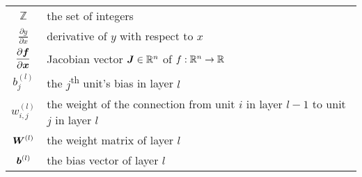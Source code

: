 \documentclass[../main.tex]{subfiles}
\begin{document}
\begin{tabular}{cl}
    $\displaystyle \mathbb{Z}$ & the set of integers\\
    $\displaystyle \frac{\partial y}{\partial x}$ & derivative of $y$ with respect to $x$\\
    $\displaystyle \frac{\partial {\bm{f}}}{\partial {\bm{x}}}$ & Jacobian vector ${\bm{J}}\in \mathbb{R}^n$ of $f:\mathbb{R}^n\to\mathbb{R}$\\
    $\displaystyle b_j^{(l)}$ & the $j$\textsuperscript{th} unit's bias in layer $l$\\
    $\displaystyle w_{i,j}^{(l)}$ & the weight of the connection from unit $i$ in layer $l-1$ to unit $j$ in layer $l$\\
    $\displaystyle {\bm{W}}^{(l)}$ & the weight matrix of layer $l$\\
    $\displaystyle {\bm{b}}^{(l)}$ & the bias vector of layer $l$
\end{tabular}
\end{document}
